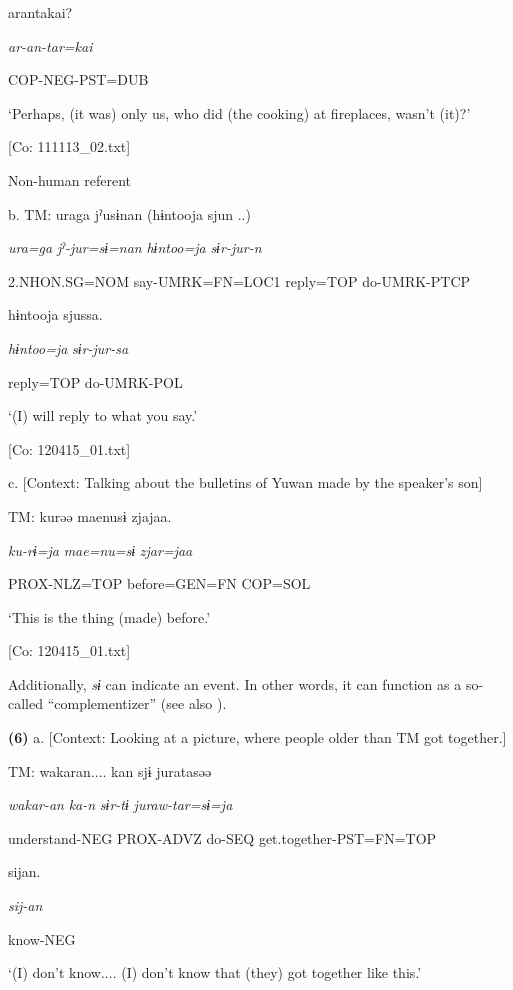       arantakai?

      \textit{ar-an-tar=kai}

      COP-NEG-PST=DUB

      ‘Perhaps, (it was) only us, who did (the cooking) at fireplaces, wasn’t (it)?’

      [Co: 111113\_02.txt]

  Non-human referent

  b.  TM:  uraga  jˀusɨnan  (hɨntooja  sjun ..)

      \textit{ura=ga}  \textit{jˀ-jur=sɨ=nan}  \textit{hɨntoo=ja}  \textit{sɨr-jur-n}

      2.NHON.SG=NOM  say-UMRK=FN=LOC1  reply=TOP  do-UMRK-PTCP

      hɨntooja  sjussa.

      \textit{hɨntoo=ja}  \textit{sɨr-jur-sa}

      reply=TOP  do-UMRK-POL

      ‘(I) will reply to what you say.’

      [Co: 120415\_01.txt]

  c.  [Context: Talking about the bulletins of Yuwan made by the speaker’s son]

    TM:  kurəə  {\textbar}mae{\textbar}nusɨ  zjajaa.

      \textit{ku-rɨ=ja}  \textit{mae=nu=sɨ}  \textit{zjar=jaa}

      PROX-NLZ=TOP  before=GEN=FN  COP=SOL

      ‘This is the thing (made) before.’

      [Co: 120415\_01.txt]

Additionally, \textit{sɨ} can indicate an event. In other words, it can function as a so-called “complementizer” (see also ).

\textbf{(6)}  a.  [Context: Looking at a picture, where people older than TM got together.]

    TM:  wakaran....  kan  sjɨ  juratasəə

      \textit{wakar-an}  \textit{ka-n}  \textit{sɨr-tɨ}  \textit{juraw-tar=sɨ=ja}

      understand-NEG  PROX-ADVZ  do-SEQ  get.together-PST=FN=TOP

      sijan.

      \textit{sij-an}

      know-NEG

      ‘(I) don’t know.... (I) don’t know that (they) got together like this.’

